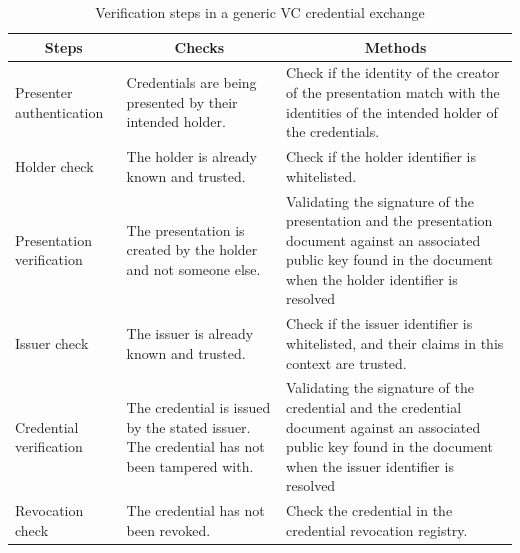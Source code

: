 \begin{table}
\caption{Verification steps in a generic \acrshort{VC} credential exchange}
\label{tab:verification-steps}
\begin{tabular}{m{10em} | m{10em} | m{18em} }
\multicolumn{1}{c}{\textbf{Steps}} & \multicolumn{1}{c}{\textbf{Checks}} & \multicolumn{1}{c}{\textbf{Methods}} \\ 
\hline
Presenter authentication & Credentials are being presented by their intended holder. & Check if the identity of the creator of the presentation match with the identities of the intended holder of the credentials. \\ 
\hline
Holder check & The holder is already known and trusted. & Check if the holder identifier is whitelisted. \\ 
\hline
Presentation verification & The presentation is created by the holder and not someone else. & Validating the signature of the presentation and the presentation document against an associated public key found in the document when the holder identifier is resolved \\ 
\hline
Issuer check & The issuer is already known and trusted. & Check if the issuer identifier is whitelisted, and their claims in this context are trusted. \\ 
\hline
Credential verification & The credential is issued by the stated issuer. The credential has not been tampered with. & Validating the signature of the credential and the credential document against an associated public key found in the document when the issuer identifier is resolved \\ 
\hline
Revocation check & The credential has not been revoked. & Check the credential in the credential revocation registry. \\ 
\end{tabular}
\end{table}


